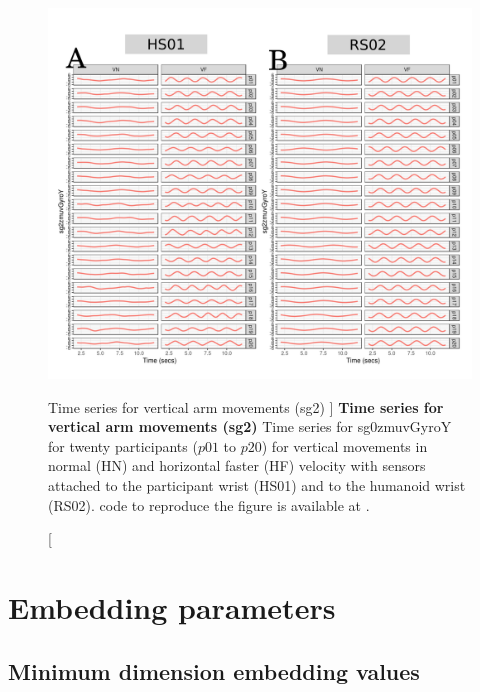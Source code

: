 \begin{figure}
\centering
\includegraphics[width=1.0\textwidth]{ts_V_sg2}
    	\caption
	[Time series for vertical arm movements (sg2) ]{
	{\bf Time series for vertical arm movements (sg2)}
		Time series for sg0zmuvGyroY for twenty participants 
		($p01$ to  $p20$) 
		for vertical movements in normal (HN) and horizontal faster (HF) 
		velocity with sensors attached to the participant wrist (HS01)
		and to the humanoid wrist (RS02).
	\R code to reproduce the figure is available at 
	.
        }
    \label{fig:aV-sg2}
\end{figure}










\newpage
\section{Embedding parameters} \label{appendix:f:ep}
\subsection{Minimum dimension embedding values}

